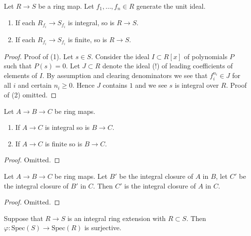 \begin{lemma}
\label{lemma-integral-local}
Let $R \to S$ be a ring map.
Let $f_1, \ldots, f_n \in R$ generate the unit ideal.
\begin{enumerate}
\item If each $R_{f_i} \to S_{f_i}$ is integral, so is $R \to S$.
\item If each $R_{f_i} \to S_{f_i}$ is finite, so is $R \to S$.
\end{enumerate}
\end{lemma}

\begin{proof}
Proof of (1).
Let $s \in S$. Consider the ideal $I \subset R[x]$ of
polynomials $P$ such that $P(s) = 0$. Let $J \subset R$
denote the ideal (!) of leading coefficients of elements of $I$.
By assumption and clearing denominators
we see that $f_i^{n_i} \in J$ for all $i$
and certain $n_i \geq 0$. Hence $J$ contains $1$ and we see
$s$ is integral over $R$. Proof of (2) omitted.
\end{proof}

\begin{lemma}
\label{lemma-integral-permanence}
Let $A \to B \to C$ be ring maps.
\begin{enumerate}
\item If $A \to C$ is integral so is $B \to C$.
\item If $A \to C$ is finite so is $B \to C$.
\end{enumerate}
\end{lemma}

\begin{proof}
Omitted.
\end{proof}

\begin{lemma}
\label{lemma-integral-closure-transitive}
Let $A \to B \to C$ be ring maps.
Let $B'$ be the integral closure of $A$ in $B$,
let $C'$ be the integral closure of $B'$ in $C$. Then
$C'$ is the integral closure of $A$ in $C$.
\end{lemma}

\begin{proof}
Omitted.
\end{proof}

\begin{lemma}
\label{lemma-integral-overring-surjective}
Suppose that $R \to S$ is an integral
ring extension with $R \subset S$.
Then $\varphi : \text{Spec}(S) \to \text{Spec}(R)$
is surjective.
\end{lemma}

